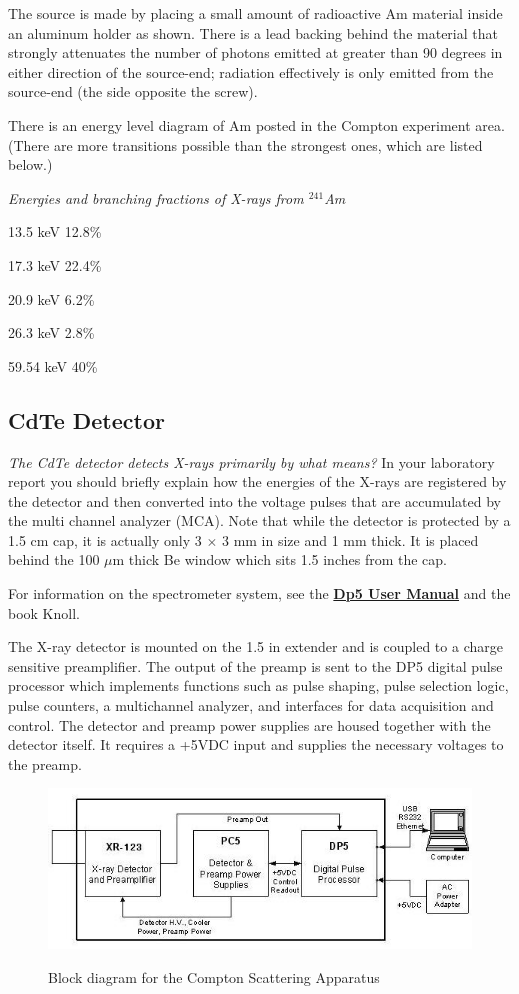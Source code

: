 \documentclass{../lab}
\begin{document}
The source is made by placing a small amount of radioactive Am material inside an aluminum holder as shown. There is a lead backing behind the material that strongly attenuates the number of photons emitted at greater than 90 degrees in either direction of the source-end; radiation effectively is only emitted from the source-end (the side opposite the screw).

There is an energy level diagram of Am posted in the Compton experiment area. (There are more transitions possible than the strongest ones, which are listed below.)

\emph{Energies and branching fractions of X-rays from $^{241}$Am}

13.5 keV 12.8\%

17.3 keV 22.4\%

20.9 keV 6.2\%

26.3 keV 2.8\%

59.54 keV 40\%

\subsection{CdTe Detector}

\emph{The CdTe detector detects X-rays primarily by what means?} In your laboratory report you should briefly explain how the energies of the X-rays are registered by the detector and then converted into the voltage pulses that are accumulated by the multi channel analyzer (MCA). Note that while the detector is protected by a 1.5 cm cap, it is actually only 3 $\times$ 3 mm in size and 1 mm thick. It is placed behind the 100 $\mu$m thick Be window which sits 1.5 inches from the cap.

For information on the spectrometer system, see the \href{http://experimentationlab.berkeley.edu/sites/default/files/images/DP5\_User\_Manual\_A1.pdf}{\textbf{Dp5 User Manual}} and the book Knoll.

The X-ray detector is mounted on the 1.5 in extender and is coupled to a charge sensitive preamplifier. The output of the preamp is sent to the DP5 digital pulse processor which implements functions such as pulse shaping, pulse selection logic, pulse counters, a multichannel analyzer, and interfaces for data acquisition and control. The detector and preamp power supplies are housed together with the detector itself. It requires a +5VDC input and supplies the necessary voltages to the preamp.

\begin{figure}
    \centering
    \href{http://experimentationlab.berkeley.edu/sites/default/files/images/COMimage01.jpg}{\includegraphics[width=0.7\linewidth]{images/COMimage01.jpg}}
    \caption{Block diagram for the Compton Scattering Apparatus}
    \label{COMimage01}
\end{figure}
\end{document}
